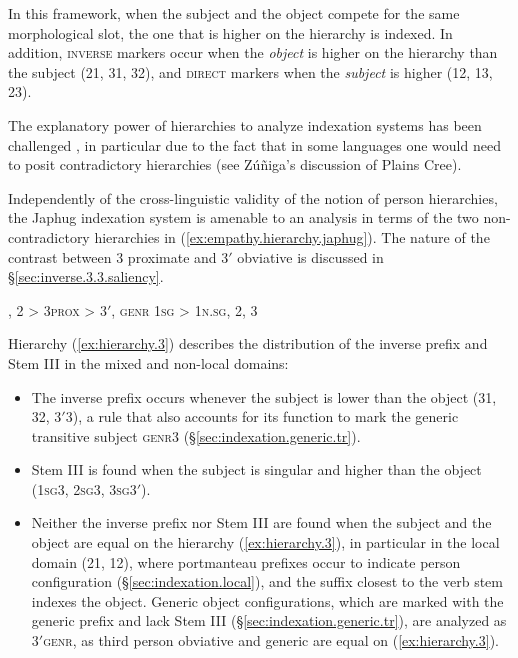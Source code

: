 In this framework, when the subject and the object compete for the same morphological slot, the one that is higher on the hierarchy is indexed. In addition, \textsc{inverse} markers occur when the \textit{object} is higher on the hierarchy than the subject (2\fl{}1, 3\fl{}1, 3\fl{}2), and \textsc{direct} markers when the \textit{subject} is higher (1\fl{}2, 1\fl{}3, 2\fl{}3). 

The explanatory power of hierarchies to analyze indexation systems has been challenged \citep{zuniga18hierarchies}, in particular due to the fact that in some languages one would need to posit contradictory hierarchies (see Zúñiga's \citeyear{zuniga06} discussion of Plains Cree).

Independently of the cross-linguistic validity of the notion of person hierarchies, the Japhug indexation system is amenable to an analysis in terms of the two non-contradictory hierarchies in (\ref{ex:empathy.hierarchy.japhug}). The nature of the contrast between 3 proximate and 3$'$ obviative is discussed in §\ref{sec:inverse.3.3.saliency}.

\begin{exe}
\ex \label{ex:empathy.hierarchy.japhug}
\begin{xlist}
\ex \label{ex:hierarchy.3}
, 2 > 3\textsc{prox} > 3$'$, \textsc{genr}
\ex \label{ex:hierarchy.1sg}
\glt \textsc{1sg} > 1\textsc{n}.\textsc{sg}, 2, 3
\end{xlist}
\end{exe}

Hierarchy (\ref{ex:hierarchy.3}) describes the distribution of the inverse  prefix and Stem III in the mixed and non-local domains: 

\begin{itemize}
\item The inverse prefix occurs whenever the subject is lower than the object (3\fl{}1, 3\fl{}2, 3$'$\fl{}3), a rule that also accounts for its function to mark the generic transitive subject \textsc{genr}\fl{}3 (§\ref{sec:indexation.generic.tr}). 
\item Stem III is found when the subject is singular and higher than the object (\textsc{1sg}\fl{}3, \textsc{2sg}\fl{}3, \textsc{3sg}\fl{}3$'$). 
\item Neither the inverse prefix nor Stem III are found when the subject and the object are equal on the hierarchy (\ref{ex:hierarchy.3}), in particular in the local domain (2\fl{}1, 1\fl{}2), where portmanteau prefixes occur to indicate person configuration (§\ref{sec:indexation.local}), and the suffix closest to the verb stem indexes the object. Generic object configurations, which are marked with the  generic prefix and lack Stem III (§\ref{sec:indexation.generic.tr}), 
are analyzed as 3$'$\fl{}\textsc{genr}, as third person obviative and generic are equal on (\ref{ex:hierarchy.3}).
\end{itemize}

